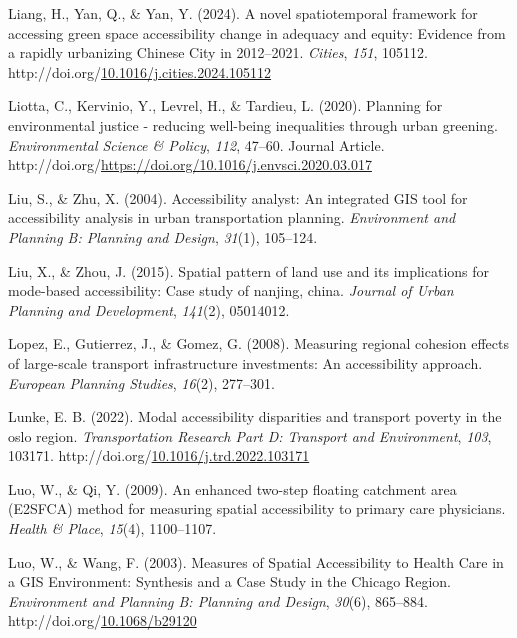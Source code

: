 \documentclass[
11pt, %
oneside, %
english, %
singlespacing, %
]{macthesis} %
\newlength{\cslhangindent}
\newenvironment{CSLReferences}[2] %
{\begin{list}{}{%
	\setlength{\itemindent}{0pt}
	\setlength{\leftmargin}{0pt}
	\setlength{\parsep}{0pt}
	\ifodd #1
	\setlength{\leftmargin}{\cslhangindent}
	\setlength{\itemindent}{-1\cslhangindent}
	\fi
	\setlength{\itemsep}{#2\baselineskip}}}
{\end{list}}
\begin{document}
\begin{CSLReferences}{1}{0}
Liang, H., Yan, Q., \& Yan, Y. (2024). A novel spatiotemporal framework for accessing green space accessibility change in adequacy and equity: {Evidence} from a rapidly urbanizing {Chinese} {City} in 2012--2021. \emph{Cities}, \emph{151}, 105112. http://doi.org/\href{https://doi.org/10.1016/j.cities.2024.105112}{10.1016/j.cities.2024.105112}

Liotta, C., Kervinio, Y., Levrel, H., \& Tardieu, L. (2020). Planning for environmental justice - reducing well-being inequalities through urban greening. \emph{Environmental Science \& Policy}, \emph{112}, 47--60. Journal Article. http://doi.org/\url{https://doi.org/10.1016/j.envsci.2020.03.017}

Liu, S., \& Zhu, X. (2004). Accessibility analyst: An integrated GIS tool for accessibility analysis in urban transportation planning. \emph{Environment and Planning B: Planning and Design}, \emph{31}(1), 105--124.

Liu, X., \& Zhou, J. (2015). Spatial pattern of land use and its implications for mode-based accessibility: Case study of nanjing, china. \emph{Journal of Urban Planning and Development}, \emph{141}(2), 05014012.

Lopez, E., Gutierrez, J., \& Gomez, G. (2008). Measuring regional cohesion effects of large-scale transport infrastructure investments: {An} accessibility approach. \emph{European Planning Studies}, \emph{16}(2), 277--301.

Lunke, E. B. (2022). Modal accessibility disparities and transport poverty in the oslo region. \emph{Transportation Research Part D: Transport and Environment}, \emph{103}, 103171. http://doi.org/\href{https://doi.org/10.1016/j.trd.2022.103171}{10.1016/j.trd.2022.103171}

Luo, W., \& Qi, Y. (2009). An enhanced two-step floating catchment area ({E2SFCA}) method for measuring spatial accessibility to primary care physicians. \emph{Health \& Place}, \emph{15}(4), 1100--1107.

Luo, W., \& Wang, F. (2003). Measures of Spatial Accessibility to Health Care in a GIS Environment: Synthesis and a Case Study in the Chicago Region. \emph{Environment and Planning B: Planning and Design}, \emph{30}(6), 865--884. http://doi.org/\href{https://doi.org/10.1068/b29120}{10.1068/b29120}


\end{CSLReferences}
\end{document}

